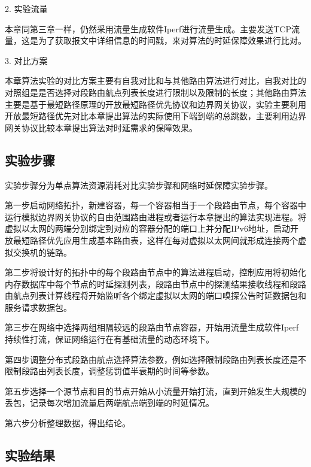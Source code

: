 2. 实验流量

本章同第三章一样，仍然采用流量生成软件Iperf进行流量生成。主要发送TCP流量，这是为了获取报文中详细信息的时间戳，来对算法的时延保障效果进行比对。

3. 对比方案

本章算法实验的对比方案主要有自我对比和与其他路由算法进行对比，自我对比的对照组是是否选择对段路由航点列表长度进行限制以及限制的长度；其他路由算法主要是基于最短路径原理的开放最短路径优先协议和边界网关协议，实验主要利用开放最短路径优先对比本章提出算法的实际使用下端到端的总跳数，主要利用边界网关协议比较本章提出算法对时延需求的保障效果。

\subsection{实验步骤}

实验步骤分为单点算法资源消耗对比实验步骤和网络时延保障实验步骤。

第一步启动网络拓扑，新建容器，每一个容器相当于一个段路由节点，每个容器中运行模拟边界网关协议的自由范围路由进程或者运行本章提出的算法实现进程。将虚拟以太网的两端分别绑定到对应的容器分配的端口上并分配IPv6地址，启动开放最短路径优先应用生成基本路由表，这样在每对虚拟以太网间就形成连接两个虚拟交换机的链路。

第二步将设计好的拓扑中的每个段路由节点中的算法进程启动，控制应用将初始化内存数据库中每个节点的时延探测列表，段路由节点中的探测结果接收线程和段路由航点列表计算线程将开始监听各个绑定虚拟以太网的端口嗅探公告时延数据包和服务请求数据包。

第三步在网络中选择两组相隔较远的段路由节点容器，开始用流量生成软件Iperf持续性打流，保证网络运行在有基础流量的动态环境下。

第四步调整分布式段路由航点选择算法参数，例如选择限制段路由列表长度还是不限制段路由列表长度，调整惩罚值半衰期的时间等参数。

第五步选择一个源节点和目的节点开始从小流量开始打流，直到开始发生大规模的丢包，记录每次增加流量后两端航点端到端的时延情况。

第六步分析整理数据，得出结论。

\subsection{实验结果}

